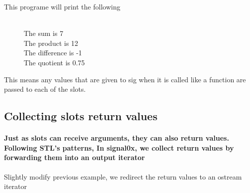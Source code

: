 \documentclass[9pt,onside,a4paper]{article}
\newcommand{\hllin}[1]{\textcolor[rgb]{0.6,0.6,0.6}{#1}}
\begin{document}
This programe will print the following  
\begin{shaded}
{\small
\ttfamily
~\\
\hllin{\ \ \ \ \ }         The sum is 7 \\
\hllin{\ \ \ \ \ }         The product is 12 \\ 
\hllin{\ \ \ \ \ }         The difference is -1 \\
\hllin{\ \ \ \ \ }         The quotient is 0.75 \\
\normalfont
}
\end{shaded}

This means any values that are given to sig when it is called like a function are passed to each of the slots.

\subsection{Collecting slots return values}

\paragraph{Just as slots can receive arguments, they can also return values. Following STL's patterns, In signal0x, we collect return values by forwarding them into an output iterator \\}

Slightly modify previous example, we redirect the return values to an ostream iterator \\
\end{document}
